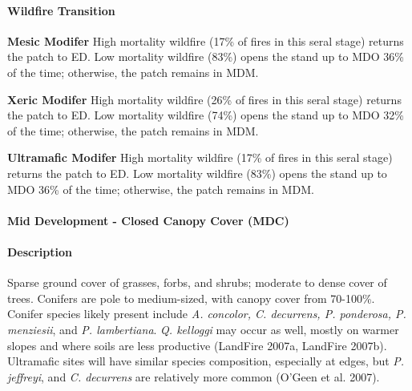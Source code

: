 \paragraph{Wildfire Transition}
\begin{adjustwidth}{2cm}{}
\textbf{Mesic Modifer } High mortality wildfire (17\% of fires in this seral stage) returns the patch to ED. Low mortality wildfire (83\%) opens the stand up to MDO 36\% of the time; otherwise, the patch remains in MDM. 

\textbf{Xeric Modifer}  High mortality wildfire (26\% of fires in this seral stage) returns the patch to ED. Low mortality wildfire (74\%) opens the stand up to MDO 32\% of the time; otherwise, the patch remains in MDM.

\textbf{Ultramafic Modifer} High mortality wildfire (17\% of fires in this seral stage) returns the patch to ED. Low mortality wildfire (83\%) opens the stand up to MDO 36\% of the time; otherwise, the patch remains in MDM.

\end{adjustwidth}

\noindent\hrulefill

\paragraph{Mid Development - Closed Canopy Cover (MDC)}

\paragraph{Description} Sparse ground cover of grasses, forbs, and shrubs; moderate to dense cover of trees. Conifers are pole to medium-sized, with canopy cover from 70-100\%. Conifer species likely present include \emph{A. concolor, C. decurrens, P. ponderosa, P. menziesii}, and \emph{P. lambertiana}. \emph{Q. kelloggi} may occur as well, mostly on warmer slopes and where soils are less productive (LandFire 2007a, LandFire 2007b). Ultramafic sites will have similar species composition, especially at edges, but \emph{P. jeffreyi}, and \emph{C. decurrens} are relatively more common (O’Geen et al. 2007).

